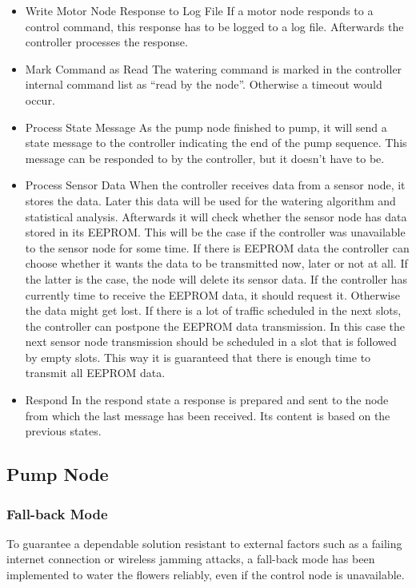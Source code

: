 \documentclass[12pt,a4paper,titlepage,oneside]{article}
\begin{document}
\begin{itemize}
	\item Write Motor Node Response to Log File
		If a motor node responds to a control command, this response has to be logged to a log file. Afterwards the controller processes the response.
	\item Mark Command as Read
		The watering command is marked in the controller internal command list as ``read by the node''. Otherwise a timeout would occur.
		
	\item Process State Message
		As the pump node finished to pump, it will send a state message to the controller indicating the end of the pump sequence. This message can be responded to by the controller, but it doesn't have to be.
		
	\item Process Sensor Data
		When the controller receives data from a sensor node, it stores the data. Later this data will be used for the watering algorithm and statistical analysis. Afterwards it will check whether the sensor node has data stored in its EEPROM. This will be the case if the controller was unavailable to the sensor node for some time. If there is EEPROM data the controller can choose whether it wants the data to be transmitted now, later or not at all. If the latter is the case, the node will delete its sensor data. If the controller has currently time to receive the EEPROM data, it should request it. Otherwise the data might get lost. If there is a lot of traffic scheduled in the next slots, the controller can postpone the EEPROM data transmission. In this case the next sensor node transmission should be scheduled in a slot that is followed by empty slots. This way it is guaranteed that there is enough time to transmit all EEPROM data.
	
	\item Respond
		In the respond state a response is prepared and sent to the node from which the last message has been received. Its content is based on the previous states.
		
	
	
\end{itemize}


\subsection{Pump Node}


\subsubsection{Fall-back Mode}
To guarantee a dependable solution resistant to external factors such as a failing internet connection or wireless jamming attacks, a fall-back mode has been implemented to water the flowers reliably, even if the control node is unavailable.
\end{document}
